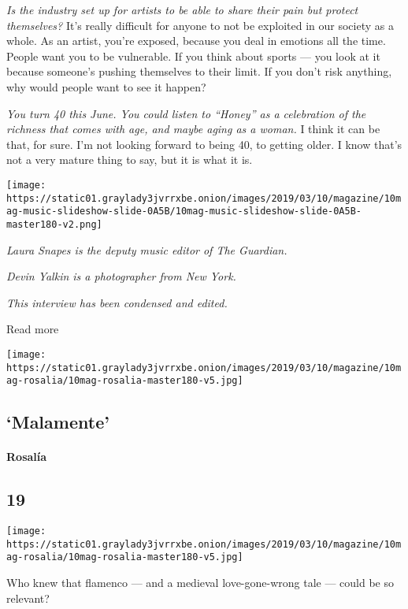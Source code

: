 \emph{Is the industry set up for artists to be able to share their pain
but protect themselves?} It's really difficult for anyone to not be
exploited in our society as a whole. As an artist, you're exposed,
because you deal in emotions all the time. People want you to be
vulnerable. If you think about sports --- you look at it because
someone's pushing themselves to their limit. If you don't risk anything,
why would people want to see it happen?

\emph{You turn 40 this June. You could listen to ``Honey'' as a
celebration of the richness that comes with age, and maybe aging as a
woman.} I think it can be that, for sure. I'm not looking forward to
being 40, to getting older. I know that's not a very mature thing to
say, but it is what it is.

\texttt{[image: https://static01.graylady3jvrrxbe.onion/images/2019/03/10/magazine/10mag-music-slideshow-slide-0A5B/10mag-music-slideshow-slide-0A5B-master180-v2.png]}

\emph{Laura Snapes is the deputy music editor of The Guardian.}

\emph{Devin Yalkin is a photographer from New York.}

\emph{This interview has been condensed and edited.}

Read more

\texttt{[image: https://static01.graylady3jvrrxbe.onion/images/2019/03/10/magazine/10mag-rosalia/10mag-rosalia-master180-v5.jpg]}

\hypertarget{--malamente}{%
\subsection{\texorpdfstring{
`Malamente'}{  `Malamente'}}\label{--malamente}}

\hypertarget{rosaluxeda}{%
\paragraph{Rosalía}\label{rosaluxeda}}

\hypertarget{19}{%
\subsection{19}\label{19}}

\texttt{[image: https://static01.graylady3jvrrxbe.onion/images/2019/03/10/magazine/10mag-rosalia/10mag-rosalia-master180-v5.jpg]}

Who knew that flamenco --- and a medieval love-gone-wrong tale --- could
be so relevant?

